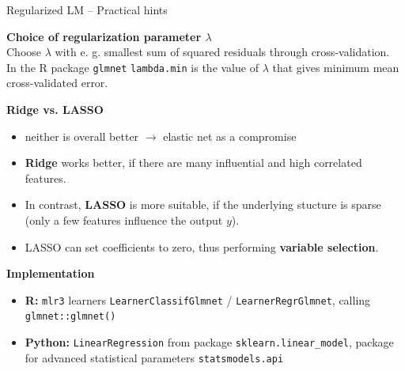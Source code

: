 \documentclass[11pt,compress,t,notes=noshow, xcolor=table]{beamer}
\newcommand{\highlight}[1]{\textcolor{highlightcol}{\textbf{#1}}}
\let\code=\texttt
\begin{document}
\begin{frame}{Regularized LM -- Practical hints}

\footnotesize

  \highlight{Choice of regularization parameter  $\lambda$} \\

 Choose $\lambda$ with e. g. smallest sum of squared residuals through cross-validation. \\
 In the R package \code{glmnet} \code{lambda.min} is the value of $\lambda$ that gives minimum mean cross-validated error.
 
\medskip

\highlight{Ridge vs. LASSO} \\
\begin{itemize}
    \item neither is overall better $\rightarrow$ elastic net as a compromise
    \item \textbf{Ridge} works better, if there are many influential and high correlated features. 
    \item In contrast, \textbf{LASSO} is more suitable, if the underlying stucture is sparse (only a few features influence the output $y$).
    \item LASSO can set coefficients to zero, thus performing \textbf{variable selection}. 
  \end{itemize}


\medskip

\highlight{Implementation}

\begin{itemize}
    \item \textbf{R:} \code{mlr3} learners \code{LearnerClassifGlmnet} / 
    \code{LearnerRegrGlmnet}, calling \code{glmnet::glmnet()}
    \item \textbf{Python:} \code{LinearRegression} from package 
    \code{sklearn.linear\_model}, package for advanced statistical parameters 
    \code{statsmodels.api} 
  \end{itemize}

\end{frame}

\end{document}
